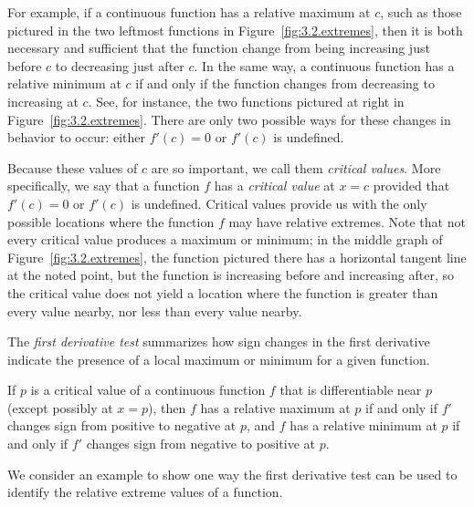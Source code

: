 For example, if a continuous function has a relative maximum at $c$, such as those pictured in the two leftmost functions in Figure~\ref{fig:3.2.extremes}, then it is both necessary and sufficient that the function change from being increasing just before $c$ to decreasing just after $c$.  In the same way, a continuous function has a relative minimum at $c$ if and only if the function changes from decreasing to increasing at $c$.  See, for instance, the two functions pictured at right in Figure~\ref{fig:3.2.extremes}.  There are only two possible ways for these changes in behavior to occur:  either $f'(c) = 0$ or $f'(c)$ is undefined.  

Because these values of $c$ are so important, we call them \emph{critical values}.  More specifically, we say that a function $f$ has a \emph{critical value}  at  $x = c$ provided that $f'(c) = 0$ or $f'(c)$ is undefined.   Critical values provide us with the only possible locations where the function $f$ may have relative extremes.  Note that not every critical value produces a maximum or minimum; in the middle graph of Figure~\ref{fig:3.2.extremes}, the function pictured there has a horizontal tangent line at the noted point, but the function is increasing before and increasing after, so the critical value does not yield a location where the function is greater than every value nearby, nor less than every value nearby.

The \emph{first derivative test}  summarizes how sign changes in the first derivative indicate the presence of a local maximum or minimum for a given function.

 { %
If $p$ is a critical value of a continuous function $f$ that is differentiable near $p$ (except possibly at $x = p$), then $f$ has a relative maximum at $p$ if and only if $f'$ changes sign from positive to negative at $p$, and $f$ has a relative minimum at $p$ if and only if $f'$ changes sign from negative to positive at $p$.
} %

We consider an example to show one way the first derivative test can be used to identify the relative extreme values of a function.




